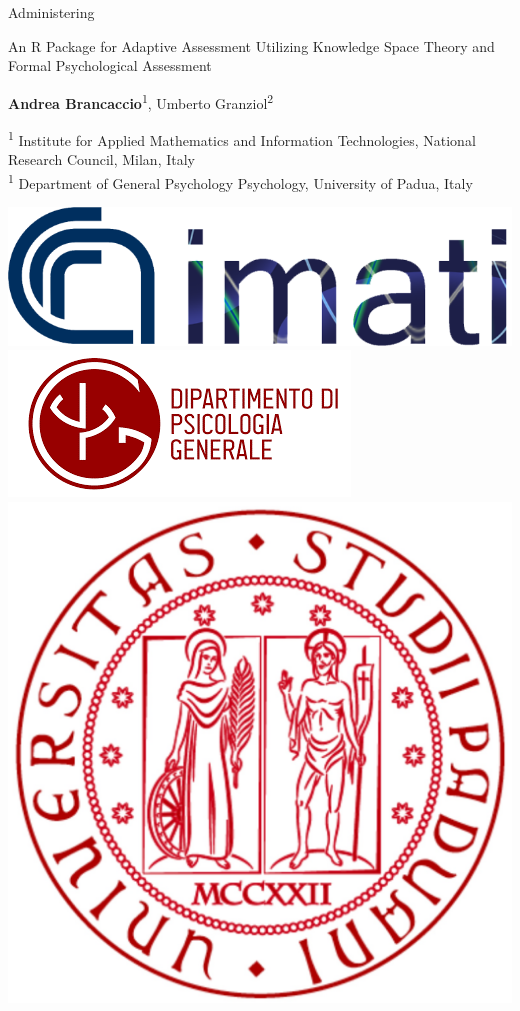 \documentclass{beamer}
\begin{document}
\begin{frame}{Administering}
	\begin{center}
		\begin{Large}
	An R Package for Adaptive Assessment Utilizing Knowledge Space Theory and Formal Psychological Assessment
		\end{Large}
		
		
		\vspace{5mm}
\textbf{Andrea Brancaccio}\textsuperscript{1}, Umberto Granziol\textsuperscript{2}

		\small
		\vspace{3mm}
		\textsuperscript{1} Institute for Applied Mathematics and Information Technologies, National Research Council, Milan, Italy \\
		\textsuperscript{1}	Department of General Psychology Psychology, University of Padua, Italy
		
	\end{center}
	
	\centering
	\includegraphics[width=.30\linewidth]{img/IMATI_logo} \hspace{8mm}
	\includegraphics[width=.30\linewidth]{img/dpg} \hspace{5mm}  \includegraphics[width=.15\linewidth]{img/logoUnipd}
	
\end{frame}
\end{document}
